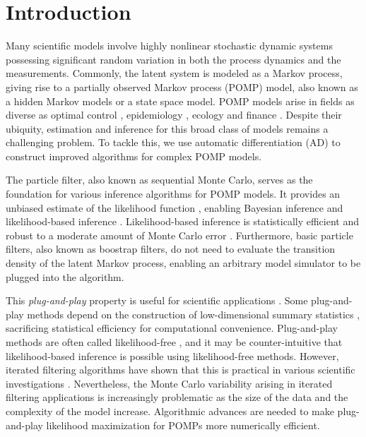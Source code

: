 \documentclass[numsec,webpdf,modern,medium,namedate]{oup-authoring-template}
\theoremstyle{thmstyleone}%
\theoremstyle{thmstyletwo}%
\theoremstyle{thmstylethree}%
\begin{document}
\maketitle

\section{Introduction}

Many scientific models involve highly nonlinear stochastic dynamic systems possessing significant random variation in both the process dynamics and the measurements.
Commonly, the latent system is modeled as a Markov process, giving rise to a partially observed Markov process (POMP) model, also known as a hidden Markov models or a state space model.
POMP models arise in fields as diverse as optimal control \citep{singh22}, epidemiology \citep{he10, stocks17}, ecology \citep{knape12} and finance \citep{kim08, breto14}.
Despite their ubiquity, estimation and inference for this broad class of models remains a challenging problem.
To tackle this, we use automatic differentiation (AD) to construct improved algorithms for complex POMP models.

The particle filter, also known as sequential Monte Carlo, serves as the foundation for various inference algorithms for POMP models.
It provides an unbiased estimate of the likelihood function  \citep{delMoral04}, enabling Bayesian inference \citep{andrieu10,chopin13} and likelihood-based inference \citep{ionides06-pnas,ionides15}.
Likelihood-based inference is statistically efficient \citep{pawitan01} and robust to a moderate amount of Monte Carlo error \citep{ionides17,ning21}.
Furthermore, basic particle filters, also known as boostrap filters, do not need to evaluate the transition density of the latent Markov process, enabling an arbitrary model simulator to be plugged into the algorithm.

This \textit{plug-and-play} property is useful for scientific applications \citep{he10}.
Some plug-and-play methods depend on the construction of low-dimensional summary statistics \citep{wood10,toni09}, sacrificing statistical efficiency for computational convenience.
Plug-and-play methods are often called likelihood-free \citep{owen15}, and it may be counter-intuitive that likelihood-based inference is possible using likelihood-free methods. 
However, iterated filtering algorithms have shown that this is practical in various scientific investigations \citep{king08,blake14,pons-salort18,subramanian21,fox22,drake23}.
Nevertheless, the Monte Carlo variability arising in iterated filtering applications is increasingly problematic as the size of the data and the complexity of the model increase.
Algorithmic advances are needed to make plug-and-play likelihood maximization for POMPs more numerically efficient.
\end{document}
